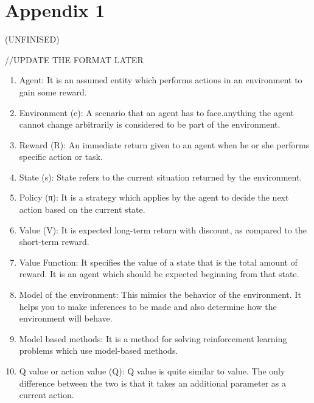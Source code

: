 \chapter{Appendix 1}(UNFINISED)

//UPDATE THE FORMAT LATER 
\begin{enumerate}

    \item{ Agent: It is an assumed entity which performs actions in an environment to gain some reward.}
    \item{Environment (e): A scenario that an agent has to face.anything the agent  cannot change arbitrarily is considered to be part of the environment.} 
    \item{Reward (R): An immediate return given to an agent when he or she performs specific action or task.}
    \item{ State (s): State refers to the current situation returned by the environment.}
    \item{Policy (π): It is a strategy which applies by the agent to decide the next action based on the current state.}
    \item{ Value (V): It is expected long-term return with discount, as compared to the short-term reward.}
    \item{ Value Function: It	specifies the value of a state that is the total amount of reward. It is an agent which should be expected beginning from that state.}
    \item{ Model of the environment: This mimics the behavior of the environment. It helps you to make inferences to be made and also determine how the environment will behave.}
    \item{ Model based methods: It is a method for solving reinforcement learning problems which use model-based methods.}
    \item{ Q value or action value (Q): Q value is quite similar to value. The only difference between the two is that it takes an additional parameter as a current action.}
\end{enumerate}

